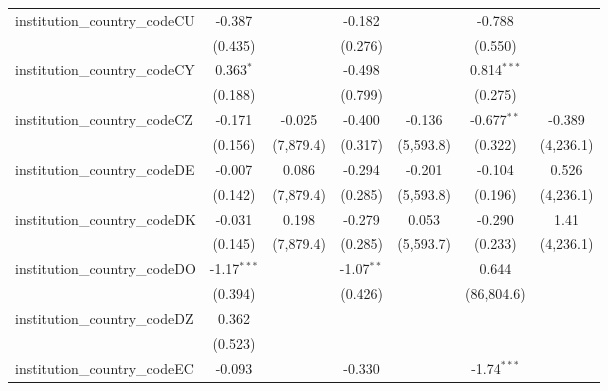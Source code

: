 \begin{tabular}{lcccccc}
   institution\_country\_codeCU          & -0.387         &               & -0.182         &               & -0.788         &   \\   
                                         & (0.435)        &               & (0.276)        &               & (0.550)        &   \\   
   institution\_country\_codeCY          & 0.363$^{*}$    &               & -0.498         &               & 0.814$^{***}$  &   \\   
                                         & (0.188)        &               & (0.799)        &               & (0.275)        &   \\   
   institution\_country\_codeCZ          & -0.171         & -0.025        & -0.400         & -0.136        & -0.677$^{**}$  & -0.389\\   
                                         & (0.156)        & (7,879.4)     & (0.317)        & (5,593.8)     & (0.322)        & (4,236.1)\\   
   institution\_country\_codeDE          & -0.007         & 0.086         & -0.294         & -0.201        & -0.104         & 0.526\\   
                                         & (0.142)        & (7,879.4)     & (0.285)        & (5,593.8)     & (0.196)        & (4,236.1)\\   
   institution\_country\_codeDK          & -0.031         & 0.198         & -0.279         & 0.053         & -0.290         & 1.41\\   
                                         & (0.145)        & (7,879.4)     & (0.285)        & (5,593.7)     & (0.233)        & (4,236.1)\\   
   institution\_country\_codeDO          & -1.17$^{***}$  &               & -1.07$^{**}$   &               & 0.644          &   \\   
                                         & (0.394)        &               & (0.426)        &               & (86,804.6)     &   \\   
   institution\_country\_codeDZ          & 0.362          &               &                &               &                &   \\   
                                         & (0.523)        &               &                &               &                &   \\   
   institution\_country\_codeEC          & -0.093         &               & -0.330         &               & -1.74$^{***}$  &   \\   

\end{tabular}
